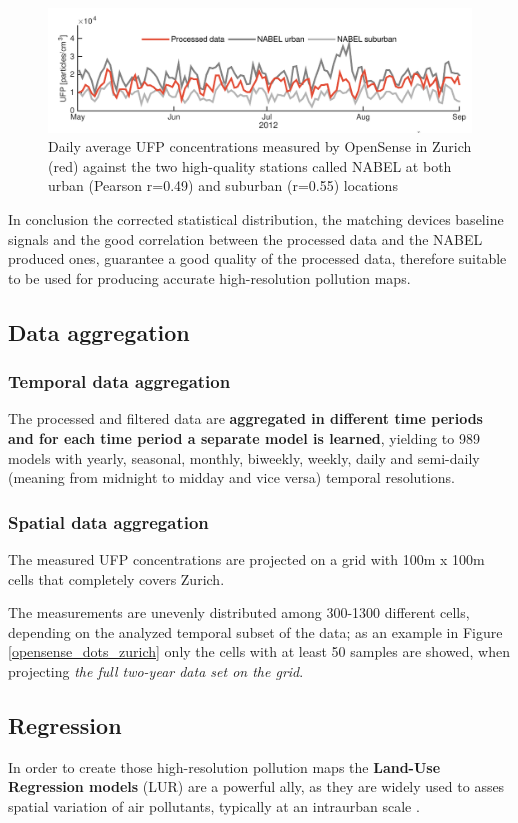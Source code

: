 \documentclass[11pt,a4paper,titlepage]{book}
\begin{document}
\begin{figure}[ht]
    \centering
    \includegraphics[width=\textwidth]{imgs/ch_2/OpenSense_processed_vs_NABEL.png}
    \caption{Daily average UFP concentrations measured by OpenSense in Zurich (red) against the two high-quality stations called NABEL at both urban (Pearson r=0.49) and suburban (r=0.55) locations} 
    \label{opensense_processed_vs_NABEL}
\end{figure}
In conclusion the corrected statistical distribution, the matching devices baseline signals and the good correlation between the processed data and the NABEL produced ones, guarantee a good quality of the processed data, therefore suitable to be used for producing accurate high-resolution pollution maps.
\subsection{Data aggregation}
\subsubsection{Temporal data aggregation}
The processed and filtered data are \textbf{aggregated in different time periods and for each time period a separate model is learned}, yielding to 989 models with yearly, seasonal, monthly, biweekly, weekly, daily and semi-daily (meaning from midnight to midday and vice versa) temporal resolutions.

\subsubsection{Spatial data aggregation}
The measured UFP concentrations are projected on a grid with 100m x 100m cells that completely covers Zurich. 

The measurements are unevenly distributed among 300-1300 different cells, depending on the analyzed temporal subset of the data; as an example in Figure \ref{opensense_dots_zurich} only the cells with at least 50 samples are showed, when projecting \textit{the full two-year data set on the grid}.
\subsection{Regression}
In order to create those high-resolution pollution maps the \textbf{Land-Use Regression models} (LUR) are a powerful ally, as they are widely used to asses spatial variation of air pollutants, typically at an intraurban scale \cite{lurmodels}.
\end{document}
